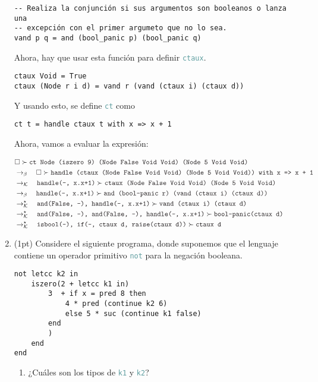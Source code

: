 \documentclass{article}
\newcommand{\tx}[1]{\textcolor{Black} {\texttt{#1}}}
\newcommand{\tp}[1]{\textcolor{CadetBlue} {\texttt{#1}}}
\newcommand{\pt}[1]{\textcolor{RoyalPurple}{(#1pt)}}
\newcommand{\es}{$\square$}
\newcommand{\pop}[2]{ \tx{#1} \succ \tx{#2}}
\newcommand{\kr}{\rightarrow_{\mathcal{K}} \quad}
\newcommand{\br}{\rightarrow_{\beta} \quad}
\newcommand{\krs}{\rightarrow_{\mathcal{K}}^{\star} \quad}
\begin{document}
\begin{enumerate}
\begin{verbatim}
-- Realiza la conjunción si sus argumentos son booleanos o lanza una
-- excepción con el primer argumeto que no lo sea.
vand p q = and (bool_panic p) (bool_panic q)
        \end{verbatim}

        Ahora, hay que usar esta función para definir \tp{ctaux}.

        \begin{verbatim}
ctaux Void = True
ctaux (Node r i d) = vand r (vand (ctaux i) (ctaux d))
        \end{verbatim}

        Y usando esto, se define \tp{ct} como

        \begin{verbatim}
ct t = handle ctaux t with x => x + 1
        \end{verbatim}

        Ahora, vamos a evaluar la expresión:

        
        \begin{align*}
        &\pop{\es}{ct Node (iszero 9) (Node False Void Void) (Node 5 Void Void)} \\
        &\br \pop{\es}{handle (ctaux (Node False Void Void) (Node 5 Void Void)) with x => x + 1}\\
        &\kr \pop{handle(-, x.x+1)}{ctaux (Node False Void Void) (Node 5 Void Void)}\\
        &\br \pop{handle(-, x.x+1)}{and (bool-panic r) (vand (ctaux i) (ctaux d))}\\
        &\krs \pop{and(False, -), handle(-, x.x+1)}{vand (ctaux i) (ctaux d)}\\
        &\krs \pop{and(False, -), and(False, -), handle(-, x.x+1)}{bool-panic(ctaux d)}\\
        &\krs \pop{isbool(-), if(-, ctaux d, raise(ctaux d))}{ctaux d}
        \end{align*}

        \item \pt{1} Considere el siguiente programa, donde suponemos que el
        lenguaje contiene un operador primitivo \tp{not} para la negación
        booleana.

        \begin{verbatim}
not letcc k2 in
    iszero(2 + letcc k1 in)
        3  + if x = pred 8 then
            4 * pred (continue k2 6)
            else 5 * suc (continue k1 false)
        end
        )
    end
end
        \end{verbatim}
        \begin{enumerate}
            \item ¿Cuáles son los tipos de \tp{k1} y \tp{k2}?


\end{enumerate}
\end{enumerate}
\end{document}
